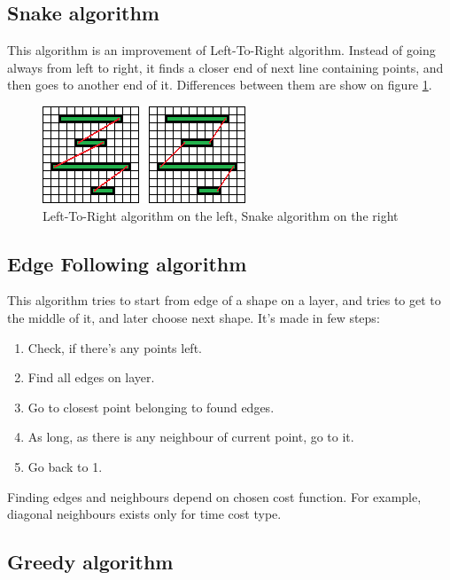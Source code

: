 \documentclass[titlepage]{article}
\begin{document}
\subsection{Snake algorithm}
This algorithm is an improvement of Left-To-Right algorithm. Instead of going always from left to right, it finds a closer end of next line containing points, and then goes to another end of it. Differences between them are show on figure \ref{img:ltr-vs-snake}.

\begin{figure}
\begin{center}
\includegraphics[scale=2]{img/ltr-vs-snake}
\caption{Left-To-Right algorithm on the left, Snake algorithm on the right}
\label{img:ltr-vs-snake}
\end{center}
\end{figure}

\subsection{Edge Following algorithm}
This algorithm tries to start from edge of a shape on a layer, and tries to get to the middle of it, and later choose next shape.
It's made in few steps:
\begin{enumerate}
\item Check, if there's any points left.
\item Find all edges on layer.
\item Go to closest point belonging to found edges.
\item As long, as there is any neighbour of current point, go to it.
\item Go back to 1.
\end{enumerate}
Finding edges and neighbours depend on chosen cost function. For example, diagonal neighbours exists only for time cost type.


\subsection{Greedy algorithm}
\end{document}
